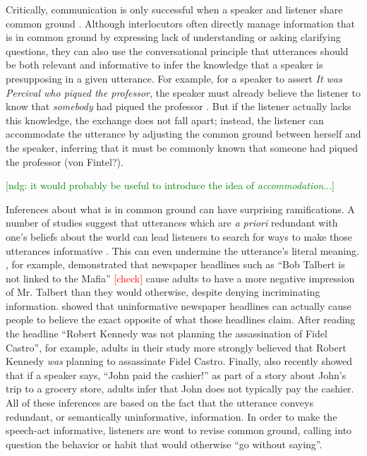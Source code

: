 \documentclass[10pt,letterpaper]{article}
\newcommand{\red}[1]{\textcolor{Red}{#1}}
\newcommand{\ndg}[1]{\textcolor{Green}{[ndg: #1]}}
\begin{document}
Critically, communication is only successful when a speaker and listener share common ground \cite{Clark1996}.
Although interlocutors often directly manage information that is in common ground by  expressing lack of understanding or asking clarifying questions, they can also use the conversational principle that utterances should be both relevant and informative \cite{Grice1975} to infer the knowledge that a speaker is presupposing in a given utterance.
For example, for a speaker to assert \emph{It was Percival who piqued the professor}, the speaker must already believe the listener to know that \emph{somebody} had piqued the professor \cite{Clark1977}.  But if the listener actually lacks this knowledge, the exchange does not fall apart; instead, the listener can accommodate the utterance by adjusting the common ground between herself and the speaker, inferring that it must be commonly known that someone had piqued the professor (von Fintel?).

\ndg{it would probably be useful to introduce the idea of \emph{accommodation}...}

Inferences about what is in common ground can have surprising ramifications.
A number of studies suggest that utterances which are \emph{a priori} redundant with one's beliefs about the world can lead listeners to search for ways to make those utterances informative \cite{Yandell1979, Wegner1981, Gruenfeld1992, Kravtchenko2015, Degen2015}.  
This can even undermine the utterance's literal meaning.  
, for example, demonstrated that newspaper headlines such as ``Bob Talbert is not linked to the Mafia'' \red{[check]} cause adults to have a more negative impression of Mr. Talbert than they would otherwise, despite denying incriminating information.  
 showed that uninformative newspaper headlines can actually cause people to believe the exact opposite of what those headlines claim.  
After reading the headline ``Robert Kennedy was not planning the assassination of Fidel Castro'', for example, adults in their study more strongly believed that Robert Kennedy \emph{was} planning to assassinate Fidel Castro.
Finally,  also recently showed that if a speaker says, ``John paid the cashier!'' as part of a story about John's trip to a grocery store, adults infer that John does not typically pay the cashier.  
All of these inferences are based on the fact that the utterance conveys redundant, or semantically uninformative, information.
In order to make the speech-act informative, listeners are wont to revise common ground, calling into question the behavior or habit that would otherwise ``go without saying''.
\end{document}
